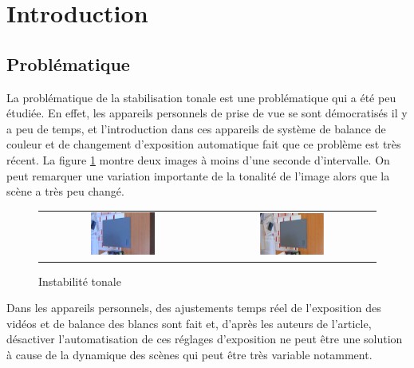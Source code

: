 \section{Introduction}
\subsection{Problématique}
La problématique de la stabilisation tonale est une problématique qui a été peu étudiée. En effet, les appareils personnels de prise de vue se sont démocratisés il y a peu de temps, et l'introduction dans ces appareils de système de balance de couleur et de changement d'exposition automatique fait que ce problème est très récent. La figure \ref{fig_unstable} montre deux images à moins d'une seconde d'intervalle. On peut remarquer une variation importante de la tonalité de l'image alors que la scène a très peu changé.\\

\begin{figure}[H]
\centering
\begin{tabular}{cc}
\includegraphics[width=0.4\textwidth]{Chapters/Images/fig_unstable2}&
\includegraphics[width=0.4\textwidth]{Chapters/Images/fig_unstable22}
\end{tabular}
\caption{Instabilité tonale}
\label{fig_unstable}
\end{figure}

Dans les appareils personnels, des ajustements temps réel de l'exposition des vidéos et de balance des blancs sont fait et, d'après les auteurs de l'article, désactiver l'automatisation de ces réglages d'exposition ne peut être une solution à cause de la dynamique des scènes qui peut être très variable notamment. \\

